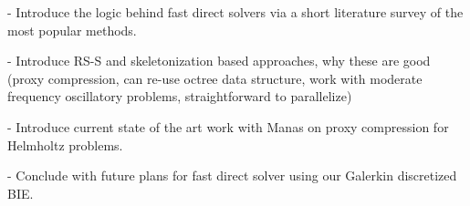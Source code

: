 - Introduce the logic behind fast direct solvers via a short literature survey of the most popular methods.

- Introduce RS-S and skeletonization based approaches, why these are good (proxy compression, can re-use octree data structure, work with moderate frequency oscillatory problems, straightforward to parallelize)

- Introduce current state of the art work with Manas on proxy compression for Helmholtz problems.

- Conclude with future plans for fast direct solver using our Galerkin discretized BIE.
